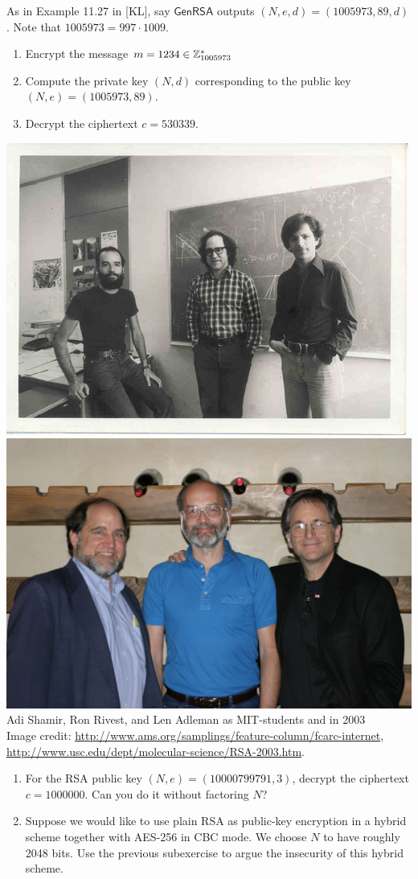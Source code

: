 \documentclass[a4paper,10pt,landscape,twocolumn]{scrartcl}
\begin{document}
\begin{exercise}[RSA]
\begin{subex}
As in Example 11.27 in [KL], say $\mathsf{GenRSA}$ outputs $(N,e,d)=(1005973,89,d)$. Note that $1005973=997 \cdot 1009$.
\begin{enumerate}
\item Encrypt the message $m=1234 \in \mathbb{Z}_{1005973}^*$
\item Compute the private key $(N,d)$ corresponding to the public key $(N,e)=(1005973,89)$.
\item Decrypt the ciphertext $c=530339$.
\end{enumerate}
\end{subex}


{
\centering
\includegraphics[height=0.15\textwidth]{RSA-MIT.jpg} \includegraphics[height=0.15\textwidth]{RSA-2003.jpg} \\
Adi Shamir, Ron Rivest, and Len Adleman as MIT-students and in 2003\\
{\small Image credit: \url{http://www.ams.org/samplings/feature-column/fcarc-internet}, \url{http://www.usc.edu/dept/molecular-science/RSA-2003.htm}}.\\
}

\begin{subex}
\begin{enumerate}
\item For the RSA public key $(N,e)=(10000799791, 3)$, decrypt the ciphertext $c=1 000 000$. Can you do it without factoring $N$?
\item Suppose we would like to use plain RSA as public-key encryption in a hybrid scheme together with AES-256 in CBC mode. We choose $N$ to have roughly 2048 bits. Use the previous subexercise to argue the insecurity of this hybrid scheme.
\end{enumerate}
\end{subex}
\end{exercise}
\end{document}
